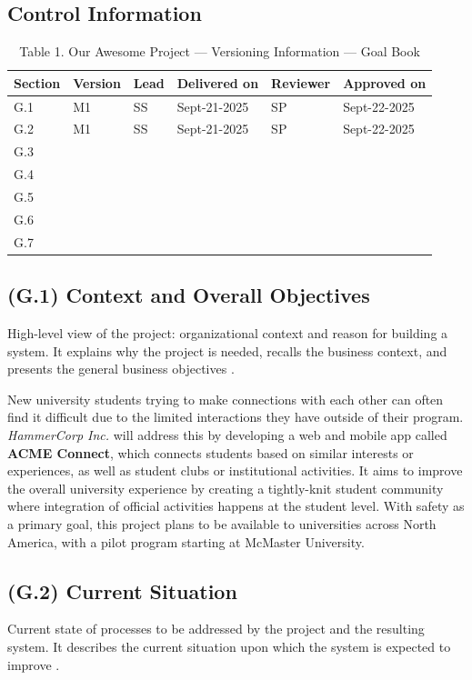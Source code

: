 \documentclass[12pt,letterpaper]{article}
\begin{document}
\subsection*{Control Information}
\begin{table}[h!]\centering
\caption*{Table 1. Our Awesome Project --- Versioning Information --- Goal Book}
\renewcommand{\arraystretch}{1.1}
\begin{tabularx}{\textwidth}{@{}l l l l l l@{}}
\toprule
\textbf{Section} & \textbf{Version} & \textbf{Lead} & \textbf{Delivered on} & \textbf{Reviewer} & \textbf{Approved on} \\
\midrule
G.1 & M1 & SS & Sept-21-2025 & SP & Sept-22-2025 \\
G.2 & M1 & SS & Sept-21-2025 & SP & Sept-22-2025 \\
G.3 & & & & & \\
G.4 & & & & & \\
G.5 & & & & & \\
G.6 & & & & & \\
G.7 & & & & & \\
\bottomrule
\end{tabularx}
\end{table}

\subsection{(G.1) Context and Overall Objectives}
High-level view of the project: organizational context and reason for building a system. It explains why the project is needed, recalls the business context, and presents the general business objectives \cite{meyer2022}.

New university students trying to make connections with each other can often find it difficult due to the limited interactions they have outside of their program. \textit{HammerCorp Inc.} will address this by developing a web and mobile app called \textbf{ACME Connect}, which connects students based on similar interests or experiences, as well as student clubs or institutional activities. It aims to improve the overall university experience by creating a tightly-knit student community where integration of official activities happens at the student level. With safety as a primary goal, this project plans to be available to universities across North America, with a pilot program starting at McMaster University.

\subsection{(G.2) Current Situation}
Current state of processes to be addressed by the project and the resulting system. It describes the current situation upon which the system is expected to improve \cite{meyer2022}.
\end{document}
